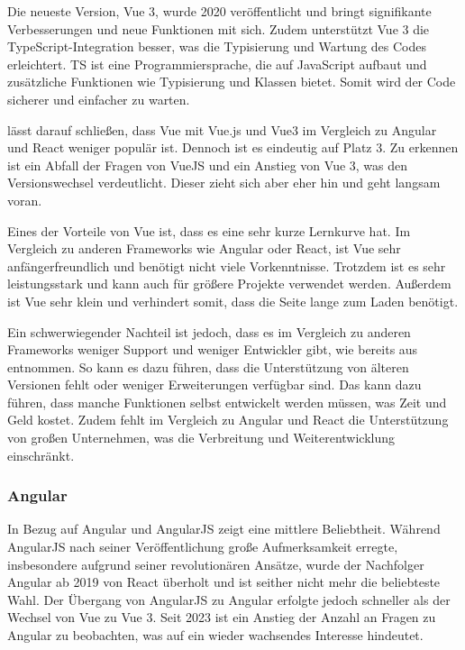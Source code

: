 \documentclass[biblatex]{lni}
\begin{document}
Die neueste Version, Vue 3,
wurde 2020 veröffentlicht und bringt signifikante Verbesserungen und neue Funktionen mit sich. \cite{vue}
Zudem unterstützt Vue 3 die TypeScript-Integration besser, was die Typisierung und Wartung des Codes erleichtert.
\ac{TS} ist eine Programmiersprache, die auf JavaScript aufbaut und zusätzliche Funktionen wie Typisierung und Klassen bietet. \cite{ts}
Somit wird der Code sicherer und einfacher zu warten.

 lässt darauf schließen,
dass Vue mit Vue.js und Vue3 im Vergleich zu Angular und React weniger populär ist.
Dennoch ist es eindeutig auf Platz 3.
Zu erkennen ist ein Abfall der Fragen von VueJS und ein Anstieg von Vue 3, was den Versionswechsel verdeutlicht.
Dieser zieht sich aber eher hin und geht langsam voran.

Eines der Vorteile von Vue ist, dass es eine sehr kurze Lernkurve hat. \cite{Dev}
Im Vergleich zu anderen Frameworks wie Angular oder React,
ist Vue sehr anfängerfreundlich und benötigt nicht viele Vorkenntnisse.
Trotzdem ist es sehr leistungsstark und kann auch für größere Projekte verwendet werden.
Außerdem ist Vue sehr klein und verhindert somit, dass die Seite lange zum Laden benötigt.

Ein schwerwiegender Nachteil ist jedoch, dass es im Vergleich zu anderen Frameworks weniger Support und weniger Entwickler gibt, wie bereits aus  entnommen. \cite{BStack}
So kann es dazu führen, dass die Unterstützung von älteren Versionen fehlt oder weniger Erweiterungen verfügbar sind.
Das kann dazu führen, dass manche Funktionen selbst entwickelt werden müssen, was Zeit und Geld kostet.
Zudem fehlt im Vergleich zu Angular und React die Unterstützung von großen Unternehmen, was die Verbreitung und Weiterentwicklung einschränkt.

\subsubsection{Angular}

In Bezug auf Angular und AngularJS zeigt  eine mittlere Beliebtheit.
Während AngularJS nach seiner Veröffentlichung große Aufmerksamkeit erregte,
insbesondere aufgrund seiner revolutionären Ansätze,
wurde der Nachfolger Angular ab 2019 von React überholt und ist seither nicht mehr die beliebteste Wahl.
Der Übergang von AngularJS zu Angular erfolgte jedoch schneller als der Wechsel von Vue zu Vue 3.
Seit 2023 ist ein Anstieg der Anzahl an Fragen zu Angular zu beobachten,
was auf ein wieder wachsendes Interesse hindeutet.
\end{document}
